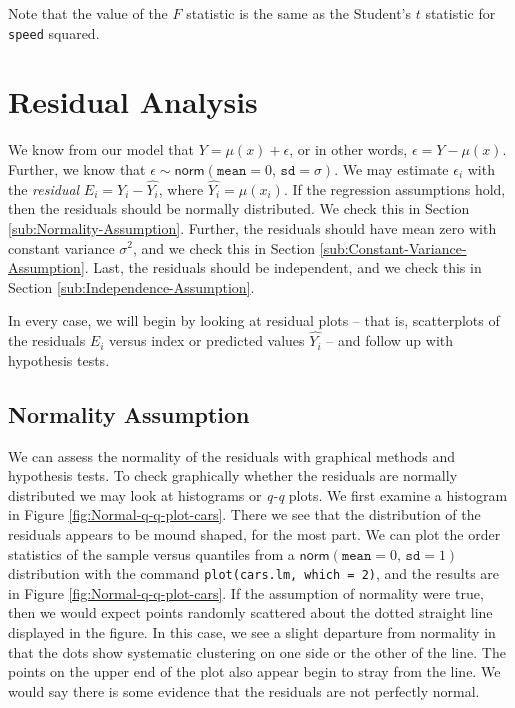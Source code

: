 \documentclass[captions=tableheading]{scrbook}
\begin{document}
Note that the value of the \(F\) statistic is the same as the Student's \(t\) statistic for \texttt{speed} squared.
\section{Residual Analysis}
\label{sec-11-4}

\label{sec:Residual-Analysis-SLR}

We know from our model that \(Y=\mu(x)+\epsilon\), or in other words, \(\epsilon=Y-\mu(x)\). Further, we know that \(\epsilon\sim\mathsf{norm}(\mathtt{mean}=0,\,\mathtt{sd}=\sigma)\). We may estimate \(\epsilon_{i}\) with the \emph{residual} \(E_{i}=Y_{i}-\hat{Y_{i}}\), where \(\hat{Y_{i}}=\hat{\mu}(x_{i})\). If the regression assumptions hold, then the residuals should be normally distributed. We check this in Section \ref{sub:Normality-Assumption}. Further, the residuals should have mean zero with constant variance \(\sigma^{2}\), and we check this in Section \ref{sub:Constant-Variance-Assumption}. Last, the residuals should be independent, and we check this in Section \ref{sub:Independence-Assumption}.

In every case, we will begin by looking at residual plots -- that is, scatterplots of the residuals \(E_{i}\) versus index or predicted values \(\hat{Y_{i}}\) -- and follow up with hypothesis tests.
\subsection{Normality Assumption}
\label{sec-11-4-1}

\label{sub:Normality-Assumption}

We can assess the normality of the residuals with graphical methods and hypothesis tests. To check graphically whether the residuals are normally distributed we may look at histograms or \emph{q-q} plots. We first examine a histogram in Figure \ref{fig:Normal-q-q-plot-cars}. There we see that the distribution of the residuals appears to be mound shaped, for the most part. We can plot the order statistics of the sample versus quantiles from a \(\mathsf{norm}(\mathtt{mean}=0,\,\mathtt{sd}=1)\) distribution with the command \texttt{plot(cars.lm, which = 2)}, and the results are in Figure \ref{fig:Normal-q-q-plot-cars}. If the assumption of normality were true, then we would expect points randomly scattered about the dotted straight line displayed in the figure. In this case, we see a slight departure from normality in that the dots show systematic clustering on one side or the other of the line. The points on the upper end of the plot also appear begin to stray from the line. We would say there is some evidence that the residuals are not perfectly normal. 
\end{document}
